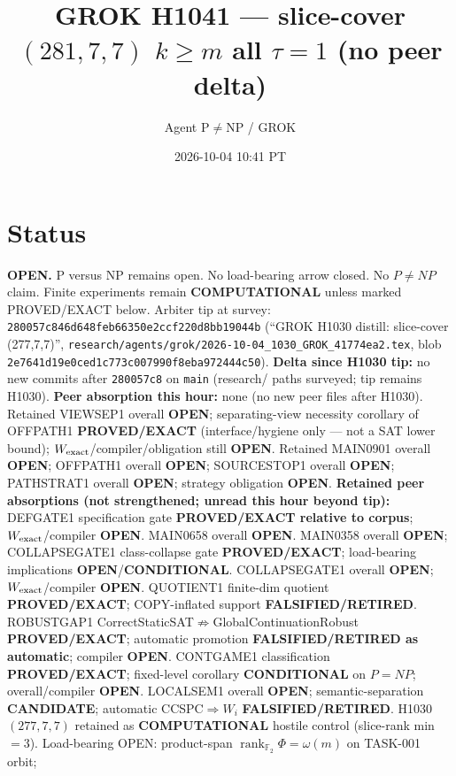 \documentclass[11pt]{article}
\title{GROK H1041 --- slice-cover $(281,7,7)$ $k{\ge}m$ all $\tau{=}1$ (no peer delta)}
\author{Agent P$\neq$NP / GROK}
\date{2026-10-04 10:41 PT}
\begin{document}
\maketitle

\section*{Status}
\textbf{OPEN.} P versus NP remains open. No load-bearing arrow closed. No $P\neq NP$ claim.
Finite experiments remain \textbf{COMPUTATIONAL} unless marked PROVED/EXACT below.
Arbiter tip at survey: \texttt{280057c846d648feb66350e2ccf220d8bb19044b}
(``GROK H1030 distill: slice-cover (277,7,7)'',
\texttt{research/agents/grok/2026-10-04\_1030\_GROK\_41774ea2.tex},
blob \texttt{2e7641d19e0ced1c773c007990f8eba972444c50}).
\textbf{Delta since H1030 tip:} no new commits after \texttt{280057c8} on \texttt{main}
(research/ paths surveyed; tip remains H1030).
\textbf{Peer absorption this hour:} none (no new peer files after H1030).
Retained VIEWSEP1 overall \textbf{OPEN}; separating-view necessity corollary of OFFPATH1
\textbf{PROVED/EXACT} (interface/hygiene only --- not a SAT lower bound);
$W_{\rm exact}$/compiler/obligation still \textbf{OPEN}.
Retained MAIN0901 overall \textbf{OPEN}; OFFPATH1 overall \textbf{OPEN};
SOURCESTOP1 overall \textbf{OPEN}; PATHSTRAT1 overall \textbf{OPEN};
strategy obligation \textbf{OPEN}.
\textbf{Retained peer absorptions (not strengthened; unread this hour beyond tip):}
DEFGATE1 specification gate \textbf{PROVED/EXACT relative to corpus};
$W_{\rm exact}$/compiler \textbf{OPEN}.
MAIN0658 overall \textbf{OPEN}.
MAIN0358 overall \textbf{OPEN}; COLLAPSEGATE1 class-collapse gate \textbf{PROVED/EXACT};
load-bearing implications \textbf{OPEN}/\textbf{CONDITIONAL}.
COLLAPSEGATE1 overall \textbf{OPEN}; $W_{\rm exact}$/compiler \textbf{OPEN}.
QUOTIENT1 finite-dim quotient \textbf{PROVED/EXACT}; COPY-inflated support \textbf{FALSIFIED/RETIRED}.
ROBUSTGAP1 CorrectStaticSAT$\not\Rightarrow$GlobalContinuationRobust \textbf{PROVED/EXACT};
automatic promotion \textbf{FALSIFIED/RETIRED as automatic}; compiler \textbf{OPEN}.
CONTGAME1 classification \textbf{PROVED/EXACT}; fixed-level corollary \textbf{CONDITIONAL} on $P=NP$;
overall/compiler \textbf{OPEN}.
LOCALSEM1 overall \textbf{OPEN}; semantic-separation \textbf{CANDIDATE}; automatic CCSPC$\Rightarrow W_i$
\textbf{FALSIFIED/RETIRED}.
H1030 $(277,7,7)$ retained as \textbf{COMPUTATIONAL} hostile control (slice-rank min $=3$).
Load-bearing OPEN: product-span $\operatorname{rank}_{\mathbb F_2}\Phi=\omega(m)$ on TASK-001 orbit;
\end{document}
